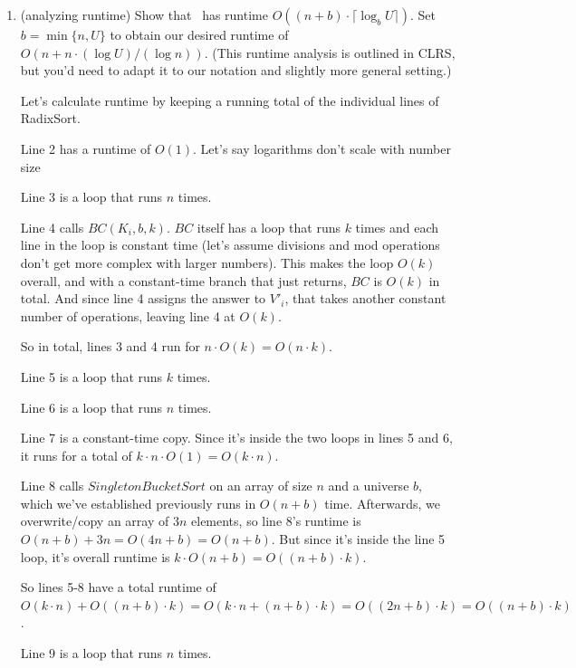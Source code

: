 \documentclass[11pt]{article}
\begin{document}
\begin{enumerate}
\begin{enumerate}
            \bigskip

            \item (analyzing runtime) Show that \RadixSort\ has runtime $O((n+b)\cdot \lceil \log_b U\rceil)$.  Set $b=\min\{n,U\}$ to obtain our desired runtime of $O(n+n\cdot (\log U)/(\log n))$.  (This runtime analysis is outlined in CLRS, but you'd need to adapt it to our notation and slightly more general setting.)
            
            \bigskip
            
            Let's calculate runtime by keeping a running total of the individual lines of RadixSort.
            
            Line 2 has a runtime of $O(1)$. Let's say logarithms don't scale with number size
            
            Line 3 is a loop that runs $n$ times.
            
            Line 4 calls $BC(K_i, b, k)$. $BC$ itself has a loop that runs $k$ times and each line in the loop is constant time (let's assume divisions and mod operations don't get more complex with larger numbers). This makes the loop $O(k)$ overall, and with a constant-time branch that just returns, $BC$ is $O(k)$ in total. And since line 4 assigns the answer to $V'_i$, that takes another constant number of operations, leaving line 4 at $O(k)$.
            
            So in total, lines 3 and 4 run for $n\cdot O(k)=O(n\cdot k)$.
            
            Line 5 is a loop that runs $k$ times.
            
            Line 6 is a loop that runs $n$ times.
            
            Line 7 is a constant-time copy. Since it's inside the two loops in lines 5 and 6, it runs for a total of $k\cdot n\cdot O(1)=O(k\cdot n)$.
            
            Line 8 calls $SingletonBucketSort$ on an array of size $n$ and a universe $b$, which we've established previously runs in $O(n+b)$ time. Afterwards, we overwrite/copy an array of $3n$ elements, so line 8's runtime is $O(n+b)+3n=O(4n+b)=O(n+b)$. But since it's inside the line 5 loop, it's overall runtime is $k\cdot O(n+b)=O((n+b)\cdot k)$.
            
            So lines 5-8 have a total runtime of $O(k\cdot n)+O((n+b)\cdot k)=O(k\cdot n + (n+b)\cdot k)=O((2n+b)\cdot k)=O((n+b)\cdot k)$.
            
            Line 9 is a loop that runs $n$ times.
            

\end{enumerate}
\end{enumerate}
\end{document}
